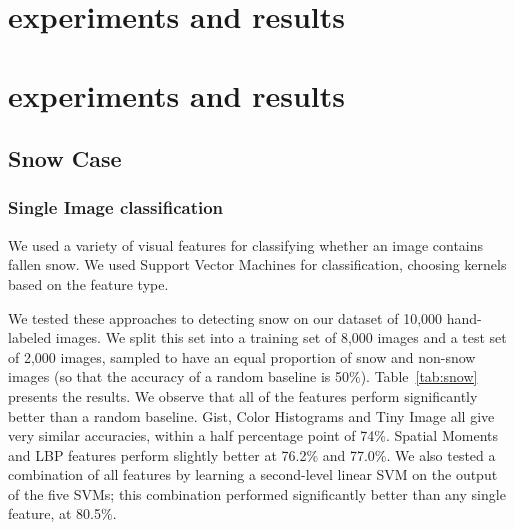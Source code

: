 \documentclass[10pt,journal,compsoc]{IEEEtran}
\begin{document}








\section{experiments and results}
\label{sec:experiments}



\section{experiments and results}




\subsection{Snow Case}

\subsubsection{Single Image classification}

We used a variety of  visual features  for classifying
whether an image contains fallen snow. We used Support Vector
Machines for classification, choosing kernels based on the feature
type. 

We tested these approaches to detecting snow on our dataset of
10,000 hand-labeled images. We split this set into a training set of
8,000 images and a test set of 2,000 images, sampled to have an
 equal proportion of snow and non-snow images (so
that the accuracy of a random baseline is 50\%).
Table~\ref{tab:snow} presents the results. We observe that all of the
features perform significantly better than a random baseline. 
Gist, Color Histograms and Tiny Image all give very similar accuracies, within a half
percentage point of 74\%. Spatial Moments and
LBP  features perform
slightly better at 76.2\% and 77.0\%. We also tested a combination of all 
features by learning a second-level linear SVM on the output of the
five SVMs; this combination performed significantly better than any single feature,
at 80.5\%.
\end{document}
